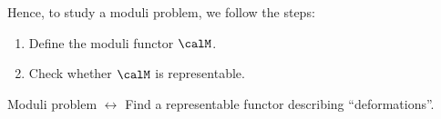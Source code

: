 




    Hence, to study a moduli problem, we follow the steps:
    \begin{enumerate}[label=\arabic*.]
        \item Define the moduli functor \(\calM\).
        \item Check whether \(\calM\) is representable.
    \end{enumerate}

    \begin{slogan}\label{slogan:moduli_problem_is_find_representable_functor}
        \hspace{1em}
        \begin{center}
            Moduli problem \(\longleftrightarrow\) Find a representable functor describing ``deformations''.
        \end{center}
    \end{slogan}

